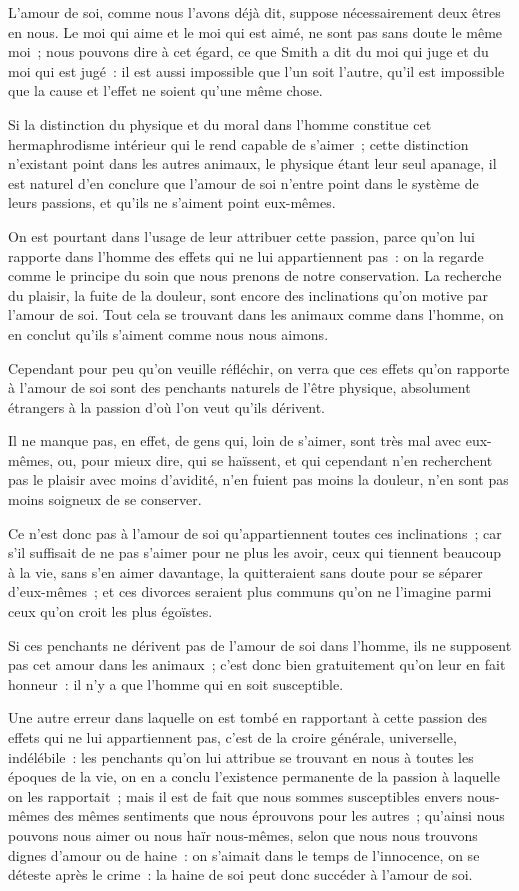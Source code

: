 \documentclass[french,twoside]{book} %
\newcommand\chaptercont{} %
\begin{document}
\chaptercont
\noindent L’amour de soi, comme nous l’avons déjà dit, suppose nécessairement deux êtres en nous. Le moi qui aime et le moi qui est aimé, ne sont pas sans doute le même moi ; nous pouvons dire à cet égard, ce que Smith a dit du moi qui juge et du moi qui est jugé : il est aussi impossible que l’un soit l’autre, qu’il est impossible que la cause et l’effet ne soient qu’une même chose.\par
Si la distinction du physique et du moral dans l’homme constitue cet hermaphrodisme intérieur qui le rend capable de s’aimer ; cette distinction n’existant point dans les autres animaux, le physique étant leur seul apanage, il est naturel d’en conclure que l’amour de soi n’entre point dans le système de leurs passions, et qu’ils ne s’aiment point eux-mêmes.\par
On est pourtant dans l’usage de leur attribuer cette passion, parce qu’on lui rapporte dans l’homme des effets qui ne lui appartiennent pas : on la regarde comme le principe du soin que nous prenons de notre conservation. La recherche du plaisir, la fuite de la douleur, sont encore des inclinations qu’on motive par l’amour de soi. Tout cela se trouvant dans les animaux comme dans l’homme, on en conclut qu’ils s’aiment comme nous nous aimons.\par
Cependant pour peu qu’on veuille réfléchir, on verra que ces effets qu’on rapporte à l’amour de soi sont des penchants naturels de l’être physique, absolument étrangers à la passion d’où l’on veut qu’ils dérivent.\par
Il ne manque pas, en effet, de gens qui, loin de s’aimer, sont très mal avec eux-mêmes, ou, pour mieux dire, qui se haïssent, et qui cependant n’en recherchent pas le plaisir avec moins d’avidité, n’en fuient pas moins la douleur, n’en sont pas moins soigneux de se conserver.\par
Ce n’est donc pas à l’amour de soi qu’appartiennent toutes ces inclinations ; car s’il suffisait de ne pas s’aimer pour ne plus les avoir, ceux qui tiennent beaucoup à la vie, sans s’en aimer davantage, la quitteraient sans doute pour se séparer d’eux-mêmes ; et ces divorces seraient plus communs qu’on ne l’imagine parmi ceux qu’on croit les plus égoïstes.\par
Si ces penchants ne dérivent pas de l’amour de soi dans l’homme, ils ne supposent pas cet amour dans les animaux ; c’est donc bien gratuitement qu’on leur en fait honneur : il n’y a que l’homme qui en soit susceptible.\par
Une autre erreur dans laquelle on est tombé en rapportant à cette passion des effets qui ne lui appartiennent pas, c’est de la croire générale, universelle, indélébile : les penchants qu’on lui attribue se trouvant en nous à toutes les époques de la vie, on en a conclu l’existence permanente de la passion à laquelle on les rapportait ; mais il est de fait que nous sommes susceptibles envers nous-mêmes des mêmes sentiments que nous éprouvons pour les autres ; qu’ainsi nous pouvons nous aimer ou nous haïr nous-mêmes, selon que nous nous trouvons dignes d’amour ou de haine : on s’aimait dans le temps de l’innocence, on se déteste après le crime : la haine de soi peut donc succéder à l’amour de soi.\par
\end{document}
